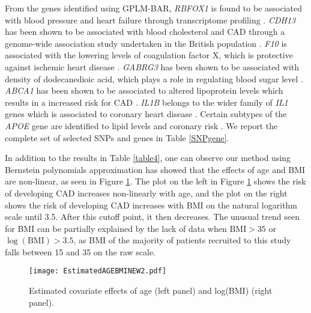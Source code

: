 \documentclass[11pt]{article}
\begin{document}
From the genes identified using GPLM-BAR, \textit{RBFOX1} is found to be associated with blood pressure and heart failure through transcriptome profiling \citep{gao2016rbfox1}. \textit{CDH13} has been shown to be associated with blood cholesterol and CAD through a genome-wide association study undertaken in the British population \citep{wellcome2007genome}.  \textit{F10} is associated with the lowering levels of coagulation factor X, which is protective against ischemic heart disease \citep{paraboschi2020rare}. \textit{GABRG3} has been shown to be associated with density of dodecanedioic acid, which plays a role in regulating blood sugar level \citep{wang2021genome}. \textit{ABCA1} has been shown to be associated to altered lipoprotein levels which results in a increased risk for CAD \citep{clee2001common}. \textit{IL1B} belongs to the wider family of \textit{IL1} genes which is associated to coronary heart disease \citep{francis1999interleukin,vohnout2003interleukin,tsimikas2014pro}. Certain subtypes of the \textit{APOE} gene are identified to lipid levels and coronary risk \citep{bennet2007association}. We report the complete set of selected SNPs and genes in Table \ref{SNPgene}. 

In addition to the results in Table \ref{table4}, one can observe our method using Bernstein polynomials approximation has showed that the effects of age and BMI are non-linear, as seen in Figure \ref{phiagebmi}. The plot on the left in Figure \ref{phiagebmi} shows the risk of developing CAD increases non-linearly with age, and the plot on the right shows the risk of developing CAD increases with BMI on the natural logarithm scale until 3.5. After this cutoff point, it then decreases. The unusual trend seen for BMI can be partially explained by the lack of data when $\text{BMI} > 35$ or $\log(\text{BMI}) > 3.5$, as BMI of the majority of patients recruited to this study falls between 15 and 35 on the raw scale.

\begin{figure}
\centering
\texttt{[image: EstimatedAGEBMINEW2.pdf]}
\caption{Estimated covariate effects of age (left panel) and log(BMI) (right panel).} \label{phiagebmi}
\end{figure}
\end{document}
